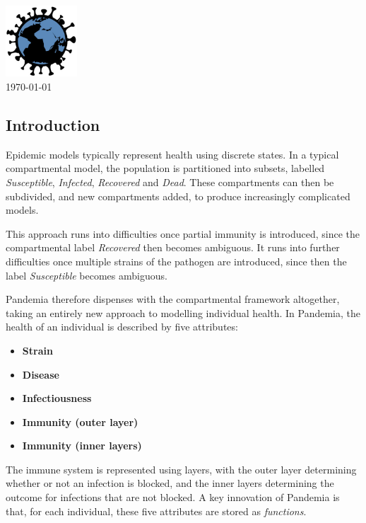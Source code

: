\documentclass[10pt,letterpaper]{article}
\begin{document}
\vspace*{0.2in}

\begin{centering}
{\huge\textbf{}}
\\
\bigskip
\includegraphics[width=0.2\textwidth]{pandemia_logo}
\\
\bigskip
\today
\\
\end{centering}

\subsection*{Introduction}
Epidemic models typically represent health using discrete states. In a typical compartmental model, the population is partitioned into subsets, labelled \textit{Susceptible}, \textit{Infected}, \textit{Recovered} and \textit{Dead}. These compartments can then be subdivided, and new compartments added, to produce increasingly complicated models.

This approach runs into difficulties once partial immunity is introduced, since the compartmental label \textit{Recovered} then becomes ambiguous. It runs into further difficulties once multiple strains of the pathogen are introduced, since then the label \textit{Susceptible} becomes ambiguous.

Pandemia therefore dispenses with the compartmental framework altogether, taking an entirely new approach to modelling individual health. In Pandemia, the health of an individual is described by five attributes:
\begin{itemize}
\item \textbf{Strain}
\item \textbf{Disease}
\item \textbf{Infectiousness}
\item \textbf{Immunity (outer layer)}
\item \textbf{Immunity (inner layers)}
\end{itemize}
The immune system is represented using layers, with the outer layer determining whether or not an infection is blocked, and the inner layers determining the outcome for infections that are not blocked. A key innovation of Pandemia is that, for each individual, these five attributes are stored as \textit{functions}.
\end{document}
